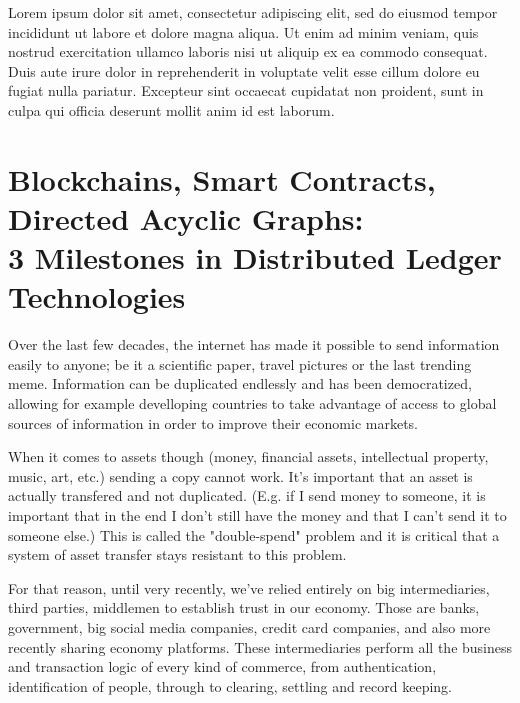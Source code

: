 \documentclass[a4paper]{article}
\begin{document}
Lorem ipsum dolor sit amet, consectetur adipiscing elit, sed do eiusmod tempor incididunt ut labore et dolore magna aliqua. Ut enim ad minim veniam, quis nostrud exercitation ullamco laboris nisi ut aliquip ex ea commodo consequat. Duis aute irure dolor in reprehenderit in voluptate velit esse cillum dolore eu fugiat nulla pariatur. Excepteur sint occaecat cupidatat non proident, sunt in culpa qui officia deserunt mollit anim id est laborum.

\newpage

\section{Blockchains, Smart Contracts, Directed Acyclic Graphs:\\ 3 Milestones in Distributed Ledger Technologies}

Over the last few decades, the internet has made it possible to send information easily to anyone; be it a scientific paper, travel pictures or the last trending meme. Information can be duplicated endlessly and has been democratized, allowing for example develloping countries to take advantage of access to global sources of information in order to improve their economic markets.

When it comes to assets though (money, financial assets, intellectual property, music, art, etc.) sending a copy cannot work. It's important that an asset is actually transfered and not duplicated. (E.g. if I send money to someone, it is important that in the end I don't still have the money and that I can't send it to someone else.) This is called the "double-spend" problem and it is critical that a system of asset transfer stays resistant to this problem.

For that reason, until very recently, we've relied entirely on big intermediaries, third parties, middlemen to establish trust in our economy. Those are banks, government, big social media companies, credit card companies, and also more recently sharing economy platforms. These intermediaries perform all the business and transaction logic of every kind of commerce, from authentication, identification of people, through to clearing, settling and record keeping. 
\end{document}
